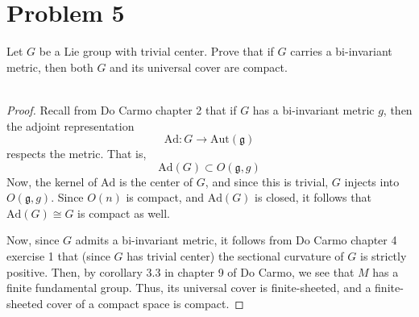 \documentclass[fontsize=11pt]{scrartcl} %
\numberwithin{equation}{section} %
\numberwithin{figure}{section} %
\numberwithin{table}{section} %
\newcommand{\Ad}{\text{Ad}}
\newcommand{\Aut}{\text{Aut}}
\begin{document}
\newpage

\section*{Problem 5}
Let $G$ be a Lie group with trivial center. Prove that if $G$ carries a
bi-invariant metric, then both $G$ and its universal cover are compact.
\\
\\
\begin{proof}
    Recall from Do Carmo chapter 2 that if $G$ has a bi-invariant metric $g$,
    then the adjoint representation
    \[
        \Ad:G\to\Aut(\mathfrak{g})
    \]
    respects the metric. That is,
    \[
        \Ad(G)\subset O(\mathfrak{g},g)
    \]
    Now, the kernel of $\Ad$ is the center of $G$, and since this is trivial,
    $G$ injects into $O(\mathfrak{g},g)$. Since $O(n)$ is compact, and $\Ad(G)$
    is closed, it follows that $\Ad(G)\cong G$ is compact as well.

    Now, since $G$ admits a bi-invariant metric, it follows from Do Carmo
    chapter 4 exercise 1 that (since $G$ has trivial center) the sectional
    curvature of $G$ is strictly positive. Then, by corollary 3.3 in chapter 9
    of Do Carmo, we see that $M$ has a finite fundamental group. Thus, its
    universal cover is finite-sheeted, and a finite-sheeted cover of a compact
    space is compact.
\end{proof}
\end{document}

